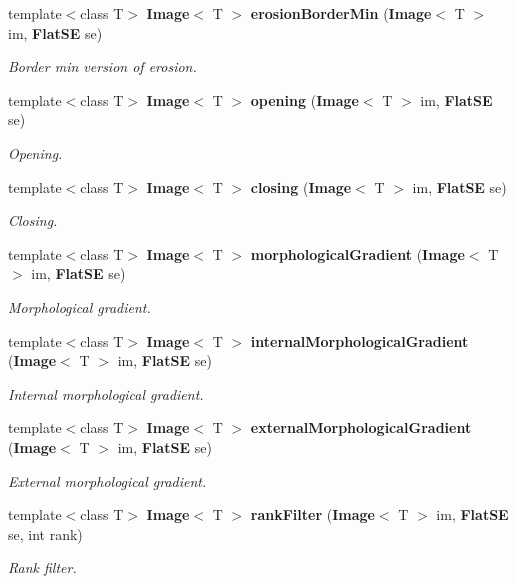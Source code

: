 \begin{CompactItemize}
template$<$class T$>$ {\bf Image}$<$ T $>$ {\bf erosion\-Border\-Min} ({\bf Image}$<$ T $>$ im, {\bf Flat\-SE} se)
\begin{CompactList}\small\item\em Border min version of erosion. \item\end{CompactList}\item 
template$<$class T$>$ {\bf Image}$<$ T $>$ {\bf opening} ({\bf Image}$<$ T $>$ im, {\bf Flat\-SE} se)
\begin{CompactList}\small\item\em Opening. \item\end{CompactList}\item 
template$<$class T$>$ {\bf Image}$<$ T $>$ {\bf closing} ({\bf Image}$<$ T $>$ im, {\bf Flat\-SE} se)
\begin{CompactList}\small\item\em Closing. \item\end{CompactList}\item 
template$<$class T$>$ {\bf Image}$<$ T $>$ {\bf morphological\-Gradient} ({\bf Image}$<$ T $>$ im, {\bf Flat\-SE} se)
\begin{CompactList}\small\item\em Morphological gradient. \item\end{CompactList}\item 
template$<$class T$>$ {\bf Image}$<$ T $>$ {\bf internal\-Morphological\-Gradient} ({\bf Image}$<$ T $>$ im, {\bf Flat\-SE} se)
\begin{CompactList}\small\item\em Internal morphological gradient. \item\end{CompactList}\item 
template$<$class T$>$ {\bf Image}$<$ T $>$ {\bf external\-Morphological\-Gradient} ({\bf Image}$<$ T $>$ im, {\bf Flat\-SE} se)
\begin{CompactList}\small\item\em External morphological gradient. \item\end{CompactList}\item 
template$<$class T$>$ {\bf Image}$<$ T $>$ {\bf rank\-Filter} ({\bf Image}$<$ T $>$ im, {\bf Flat\-SE} se, int rank)
\begin{CompactList}\small\item\em Rank filter. \item\end{CompactList}\item 

\end{CompactItemize}
